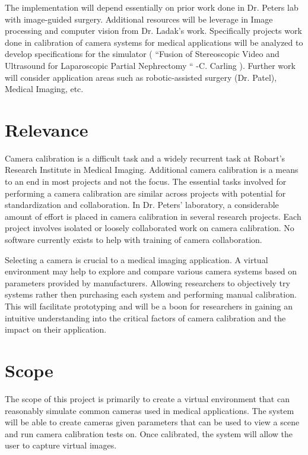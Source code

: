 \documentclass[11pt]{report}
\begin{document}
The implementation will depend essentially on prior work done in Dr. Peters lab with image-guided surgery. Additional resources will be leverage in Image processing and computer vision from Dr. Ladak’s work. Specifically projects work done in calibration of camera systems for medical applications will be analyzed to develop specifications for the simulator ( “Fusion of Stereoscopic Video and Ultrasound for Laparoscopic Partial Nephrectomy “ -C. Carling ). Further work will consider application areas such as robotic-assisted surgery (Dr. Patel), Medical Imaging, etc. 

\section{Relevance}

Camera calibration is a difficult task and a widely recurrent task at Robart's Research Institute in Medical Imaging. Additional camera calibration is a means to an end in most projects and not the focus. The essential tasks involved for performing a camera calibration are similar across projects with potential for standardization and collaboration. In Dr. Peters' laboratory, a considerable amount of effort is placed in camera calibration in several research projects. Each project involves isolated or loosely collaborated work on camera calibration. No software currently exists to help with training of camera collaboration. 

Selecting a camera is crucial to a medical imaging application. A virtual environment may help to explore and compare various camera systems based on parameters provided by manufacturers. Allowing researchers to objectively try systems rather then purchasing each system and performing manual calibration. This will facilitate prototyping and will be a boon for researchers in  gaining an intuitive understanding into the critical factors of camera calibration and the impact on their application. 

\section{Scope}
The scope of this project is primarily to create a virtual environment that can reasonably simulate common cameras used in medical applications. The system will be able to create cameras given parameters that can be used to view a scene and run camera calibration tests on. Once calibrated, the system will allow the user to capture virtual images. 
 
\end{document}
